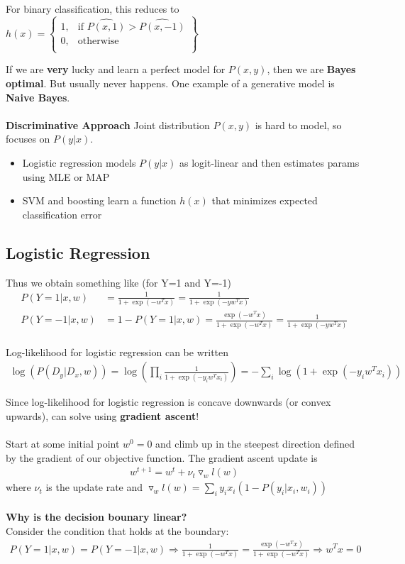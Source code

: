 \documentclass[a4paper]{article}\usepackage[]{graphicx}\usepackage[]{color}
\begin{document}
For binary classification, this reduces to 
$h(x) = \left\{\begin{array}{lr}
1, & \text{if } \hat{P(x,1)} > \hat{P(x,-1)} \\
0, & \text{otherwise } \\
\end{array}\right\}$

If we are \textbf{very} lucky and learn a perfect model for $P(x,y)$, then we are \textbf{Bayes optimal}. But usually never happens. One example of a generative model is \textbf{Naive Bayes}. \\
\\
\textbf{Discriminative Approach}
Joint distribution $P(x,y)$ is hard to model, so focuses on $P(y|x)$. 
\begin{itemize}
\item Logistic regression models $P(y|x)$ as logit-linear and then estimates params using MLE or MAP 
\item SVM and boosting learn a function $h(x)$ that minimizes expected classification error 
\end{itemize}

\subsection{Logistic Regression}

Thus we obtain something like (for Y=1 and Y=-1)
\begin{align*}
P(Y=1|x,w) &= \frac{1}{1+\exp(-w^Tx)} = \frac{1}{1+\exp(-yw^Tx)} \\
P(Y=-1|x,w) &= 1-P(Y=1|x,w) = \frac{\exp(-w^Tx)}{1+\exp(-w^Tx)} = \frac{1}{1+\exp(-yw^Tx)} \\
\end{align*}

Log-likelihood for logistic regression can be written
\begin{align*}
\log(P(D_y|D_x,w)) = \log\left(\prod_i \frac{1}{1+\exp(-y_i w^T x_i)}\right) = -\sum_i \log(1+\exp(-y_i w^T x_i))
\end{align*}

Since log-likelihood for logistic regression is concave downwards (or convex upwards), can solve using \textbf{gradient ascent}! \\
\\
Start at some initial point $w^0=0$ and climb up in the steepest direction defined by the gradient of our objective function. The gradient ascent update is
\begin{align*}
w^{t+1} = w^t + \nu_t \triangledown_w l(w)
\end{align*}
where $\nu_t$ is the update rate and $\triangledown_w l(w)=\sum_i y_i x_i (1-P(y_i|x_i,w_i))$ \\
\\
\textbf{Why is the decision bounary linear?}\\
Consider the condition that holds at the boundary:
\begin{align*}
P(Y=1|x,w)=P(Y=-1|x,w) \Rightarrow \frac{1}{1+\exp(-w^T x)} = \frac{\exp(-w^T x)}{1+\exp(-w^T x)} \Rightarrow w^Tx =0 
\end{align*}
\end{document}
